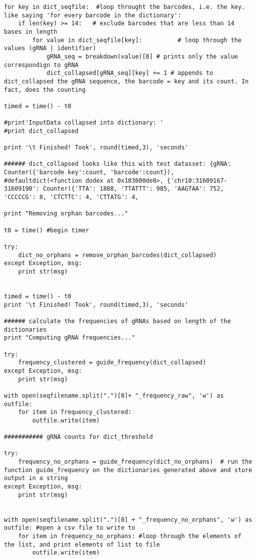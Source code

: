 \begin{footnotesize}
\begin{lstlisting}
for key in dict_seqfile:  #loop throught the barcodes, i.e. the key. like saying 'for every barcode in the dictionary':
    if len(key) >= 14:   # exclude barcodes that are less than 14 bases in length
        for value in dict_seqfile[key]:          # loop through the values (gRNA | identifier)
            gRNA_seq = breakdown(value)[0] # prints only the value correspondign to gRNA
            dict_collapsed[gRNA_seq][key] += 1 # appends to dict_collapsed the gRNA sequence, the barcode = key and its count. In fact, does the counting

timed = time() - t0

#print'InputData collapsed into dictionary: '
#print dict_collapsed

print '\t Finished! Took', round(timed,3), 'seconds'

###### dict_collapsed looks like this with test datasset: {gRNA: Counter({'barcode key':count, 'barcode':count}),
#defaultdict(<function dodex at 0x103000de8>, {'chr10:31609167-31609190': Counter({'TTA': 1888, 'TTATTT': 985, 'AAGTAA': 752, 'CCCCCG': 8, 'CTCTTC': 4, 'CTTATG': 4,

print "Removing orphan barcodes..."

t0 = time() #begin timer

try:
    dict_no_orphans = remove_orphan_barcodes(dict_collapsed)
except Exception, msg:
    print str(msg)


timed = time() - t0
print '\t Finished! Took', round(timed,3), 'seconds'

###### calculate the frequencies of gRNAs based on length of the dictionaries
print "Computing gRNA frequencies..."

try:
    frequency_clustered = guide_frequency(dict_collapsed)
except Exception, msg:
    print str(msg)

with open(seqfilename.split(".")[0]+ "_frequency_raw", 'w') as outfile:
    for item in frequency_clustered:
        outfile.write(item)

########### gRNA counts for dict_threshold

try:
    frequency_no_orphans = guide_frequency(dict_no_orphans)  # run the function guide_frequency on the dictionaries generated above and store output in a string
except Exception, msg:
    print str(msg)


with open(seqfilename.split(".")[0] + "_frequency_no_orphans", 'w') as outfile: #open a csv file to write to
    for item in frequency_no_orphans: #loop through the elements of the list, and print elements of list to file
        outfile.write(item)


\end{lstlisting}
\end{footnotesize}
